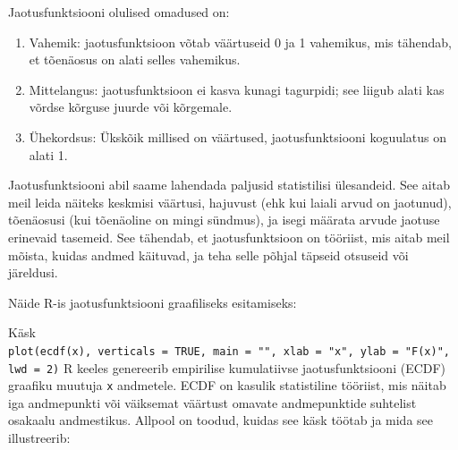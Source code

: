 \documentclass[
]{book}
\begin{document}
Jaotusfunktsiooni olulised omadused on:

\begin{enumerate}
\def\labelenumi{\arabic{enumi}.}
\item
  Vahemik: jaotusfunktsioon võtab väärtuseid 0 ja 1 vahemikus, mis tähendab, et tõenäosus on alati selles vahemikus.
\item
  Mittelangus: jaotusfunktsioon ei kasva kunagi tagurpidi; see liigub alati kas võrdse kõrguse juurde või kõrgemale.
\item
  Ühekordsus: Ükskõik millised on väärtused, jaotusfunktsiooni koguulatus on alati 1.
\end{enumerate}

Jaotusfunktsiooni abil saame lahendada paljusid statistilisi ülesandeid. See aitab meil leida näiteks keskmisi väärtusi, hajuvust (ehk kui laiali arvud on jaotunud), tõenäosusi (kui tõenäoline on mingi sündmus), ja isegi määrata arvude jaotuse erinevaid tasemeid. See tähendab, et jaotusfunktsioon on tööriist, mis aitab meil mõista, kuidas andmed käituvad, ja teha selle põhjal täpseid otsuseid või järeldusi.

Näide R-is jaotusfunktsiooni graafiliseks esitamiseks:

Käsk \texttt{plot(ecdf(x),\ verticals\ =\ TRUE,\ main\ =\ "",\ xlab\ =\ "x",\ ylab\ =\ "F(x)",\ lwd\ =\ 2)} R keeles genereerib empirilise kumulatiivse jaotusfunktsiooni (ECDF) graafiku muutuja \texttt{x} andmetele. ECDF on kasulik statistiline tööriist, mis näitab iga andmepunkti või väiksemat väärtust omavate andmepunktide suhtelist osakaalu andmestikus. Allpool on toodud, kuidas see käsk töötab ja mida see illustreerib:
\end{document}
